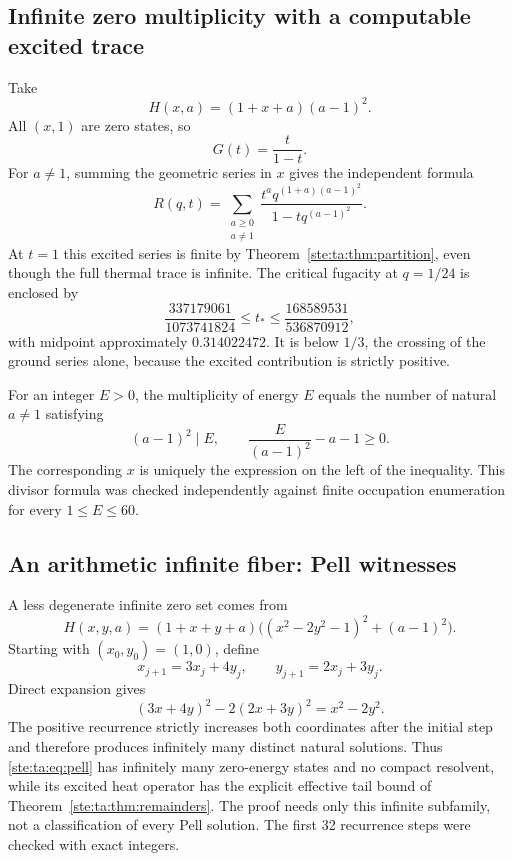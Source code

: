 \documentclass[11pt,letterpaper]{article}
\theoremstyle{definition}
\theoremstyle{remark}
\begin{document}
\subsection{Infinite zero multiplicity with a computable excited trace}
Take
\begin{equation}\label{ste:ta:eq:infiniteexample}
H(x,a)=(1+x+a)(a-1)^2.
\end{equation}
All $(x,1)$ are zero states, so
\[
G(t)=\frac{t}{1-t}.
\]
For $a\ne1$, summing the geometric series in $x$ gives the independent formula
\begin{equation}\label{ste:ta:eq:explicitR}
R(q,t)=\sum_{\substack{a\ge0\\a\ne1}}
\frac{t^a q^{(1+a)(a-1)^2}}{1-tq^{(a-1)^2}}.
\end{equation}
At $t=1$ this excited series is finite by Theorem~\ref{ste:ta:thm:partition}, even though the full thermal trace is infinite. The critical fugacity at $q=1/24$ is enclosed by
\[
\frac{337179061}{1073741824}\le t_*\le
\frac{168589531}{536870912},
\]
with midpoint approximately $0.314022472$. It is below $1/3$, the crossing of the ground series alone, because the excited contribution is strictly positive.

For an integer $E>0$, the multiplicity of energy $E$ equals the number of natural $a\ne1$ satisfying
\[
(a-1)^2\mid E,\qquad
\frac{E}{(a-1)^2}-a-1\ge0.
\]
The corresponding $x$ is uniquely the expression on the left of the inequality. This divisor formula was checked independently against finite occupation enumeration for every $1\le E\le60$.

\subsection{An arithmetic infinite fiber: Pell witnesses}
A less degenerate infinite zero set comes from
\begin{equation}\label{ste:ta:eq:pell}
H(x,y,a)=(1+x+y+a)
\bigl((x^2-2y^2-1)^2+(a-1)^2\bigr).
\end{equation}
Starting with $(x_0,y_0)=(1,0)$, define
\[
x_{j+1}=3x_j+4y_j,\qquad y_{j+1}=2x_j+3y_j.
\]
Direct expansion gives
\[
(3x+4y)^2-2(2x+3y)^2=x^2-2y^2.
\]
The positive recurrence strictly increases both coordinates after the initial step and therefore produces infinitely many distinct natural solutions. Thus \eqref{ste:ta:eq:pell} has infinitely many zero-energy states and no compact resolvent, while its excited heat operator has the explicit effective tail bound of Theorem~\ref{ste:ta:thm:remainders}. The proof needs only this infinite subfamily, not a classification of every Pell solution. The first 32 recurrence steps were checked with exact integers.
\end{document}
